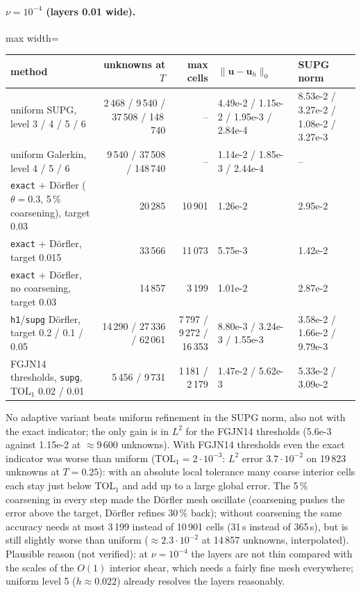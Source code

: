 \documentclass[11pt,a4paper]{article}
\newcommand{\bu}{\boldsymbol{u}}
\newcommand{\code}[1]{\texttt{#1}}
\begin{document}
\paragraph{$\nu=10^{-4}$ (layers 0.01 wide).}
\begin{center}\begin{adjustbox}{max width=\textwidth}
\begin{tabular}{lrrll}
\toprule
method & unknowns at $T$ & max cells & $\|\bu-\bu_h\|_0$ & SUPG norm\\
\midrule
uniform SUPG, level 3 / 4 / 5 / 6 & 2\,468 / 9\,540 / 37\,508 / 148\,740 & -- & 4.49e-2 / 1.15e-2 / 1.95e-3 / 2.84e-4 & 8.53e-2 / 3.27e-2 / 1.08e-2 / 3.27e-3\\
uniform Galerkin, level 4 / 5 / 6 & 9\,540 / 37\,508 / 148\,740 & -- & 1.14e-2 / 1.85e-3 / 2.44e-4 & --\\
\code{exact} + D\"orfler ($\theta=0.3$, 5\,\% coarsening), target 0.03 & 20\,285 & 10\,901 & 1.26e-2 & 2.95e-2\\
\code{exact} + D\"orfler, target 0.015 & 33\,566 & 11\,073 & 5.75e-3 & 1.42e-2\\
\code{exact} + D\"orfler, no coarsening, target 0.03 & 14\,857 & 3\,199 & 1.01e-2 & 2.87e-2\\
\code{h1}/\code{supg} D\"orfler, target 0.2 / 0.1 / 0.05 & 14\,290 / 27\,336 / 62\,061 & 7\,797 / 9\,272 / 16\,353 & 8.80e-3 / 3.24e-3 / 1.55e-3 & 3.58e-2 / 1.66e-2 / 9.79e-3\\
FGJN14 thresholds, \code{supg}, TOL$_1$ 0.02 / 0.01 & 5\,456 / 9\,731 & 1\,181 / 2\,179 & 1.47e-2 / 5.62e-3 & 5.33e-2 / 3.09e-2\\
\bottomrule
\end{tabular}
\end{adjustbox}\end{center}
No adaptive variant beats uniform refinement in the SUPG norm, also not with the exact indicator; the only gain is in
$L^2$ for the FGJN14 thresholds (5.6e-3 against 1.15e-2 at $\approx9\,600$ unknowns). With FGJN14 thresholds even the exact
indicator was worse than uniform (TOL$_1=2\cdot10^{-3}$: $L^2$ error $3.7\cdot10^{-2}$ on 19\,823 unknowns at $T=0.25$):
with an absolute local tolerance many coarse interior cells each stay just below TOL$_1$ and add up to a large global
error. The 5\,\% coarsening in every step made the D\"orfler mesh oscillate (coarsening pushes the error above the target,
D\"orfler refines 30\,\% back); without coarsening the same accuracy needs at most 3\,199 instead of 10\,901 cells (31\,s
instead of 365\,s), but is still slightly worse than uniform ($\approx2.3\cdot10^{-2}$ at 14\,857 unknowns, interpolated).
Plausible reason (not verified): at $\nu=10^{-4}$ the layers are not thin compared with the scales of the $O(1)$ interior
shear, which needs a fairly fine mesh everywhere; uniform level 5 ($h\approx0.022$) already resolves the layers reasonably.
\end{document}
